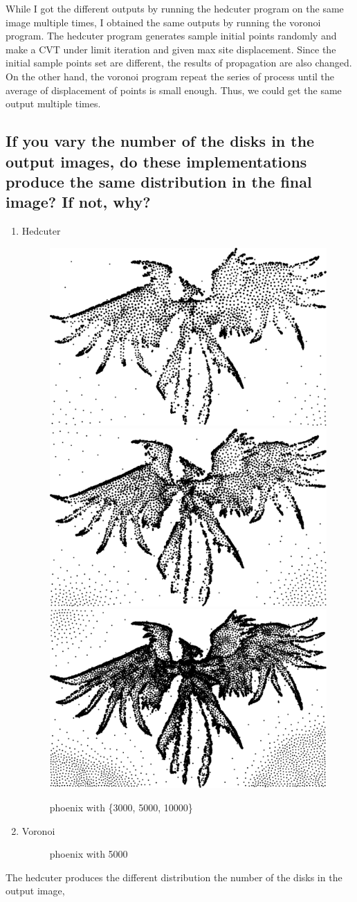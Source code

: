 \documentclass[11pt]{article}
\begin{document}
While I got the different outputs by running the hedcuter program on the same image multiple times, I obtained the same outputs by running the voronoi program. The hedcuter program generates sample initial points randomly and make a CVT under limit iteration and given max site displacement. Since the initial sample points set are different, the results of propagation are also changed. On the other hand, the voronoi program repeat the series of process until the average of displacement of points is small enough. Thus, we could get the same output multiple times.

\subsection{If you vary the number of the disks in the output images, do these implementations produce the same distribution in the final image? If not, why?}

\begin{enumerate}
	\item Hedcuter
	\begin{figure}[htbp]
 	 \centering
	  \includegraphics[width=.23\textwidth]{FIGS/hedcut/svg/phoenix-3000-h}
	  \includegraphics[width=.23\textwidth]{FIGS/hedcut/svg/phoenix-5000-h1}
	  \includegraphics[width=.23\textwidth]{FIGS/hedcut/svg/phoenix-10000-h}
 	 \caption{phoenix with \{3000, 5000, 10000\}}
	\end{figure}
	\item Voronoi
	\begin{figure}[htbp]
 	 \centering

 	 \caption{phoenix with 5000}
	\end{figure}
\end{enumerate}
The hedcuter produces the different distribution the number of the disks in the output image, 
\end{document}

